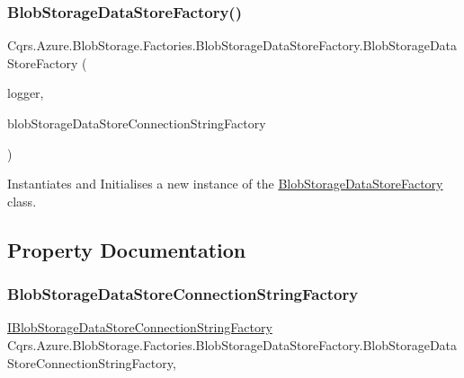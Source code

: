\subsubsection{\texorpdfstring{Blob\+Storage\+Data\+Store\+Factory()}{BlobStorageDataStoreFactory()}}
{\footnotesize\ttfamily Cqrs.\+Azure.\+Blob\+Storage.\+Factories.\+Blob\+Storage\+Data\+Store\+Factory.\+Blob\+Storage\+Data\+Store\+Factory (\begin{DoxyParamCaption}\item[{I\+Logger}]{logger,  }\item[{\hyperlink{interfaceCqrs_1_1Azure_1_1BlobStorage_1_1DataStores_1_1IBlobStorageDataStoreConnectionStringFactory}{I\+Blob\+Storage\+Data\+Store\+Connection\+String\+Factory}}]{blob\+Storage\+Data\+Store\+Connection\+String\+Factory }\end{DoxyParamCaption})\hspace{0.3cm}{\ttfamily [protected]}}



Instantiates and Initialises a new instance of the \hyperlink{classCqrs_1_1Azure_1_1BlobStorage_1_1Factories_1_1BlobStorageDataStoreFactory}{Blob\+Storage\+Data\+Store\+Factory} class. 



\subsection{Property Documentation}
\mbox{\label{classCqrs_1_1Azure_1_1BlobStorage_1_1Factories_1_1BlobStorageDataStoreFactory_a5df6d152d265ee439183ef60b3deb666_a5df6d152d265ee439183ef60b3deb666}} 
\subsubsection{\texorpdfstring{Blob\+Storage\+Data\+Store\+Connection\+String\+Factory}{BlobStorageDataStoreConnectionStringFactory}}
{\footnotesize\ttfamily \hyperlink{interfaceCqrs_1_1Azure_1_1BlobStorage_1_1DataStores_1_1IBlobStorageDataStoreConnectionStringFactory}{I\+Blob\+Storage\+Data\+Store\+Connection\+String\+Factory} Cqrs.\+Azure.\+Blob\+Storage.\+Factories.\+Blob\+Storage\+Data\+Store\+Factory.\+Blob\+Storage\+Data\+Store\+Connection\+String\+Factory\hspace{0.3cm}{\ttfamily [get]}, {\ttfamily [protected]}}




